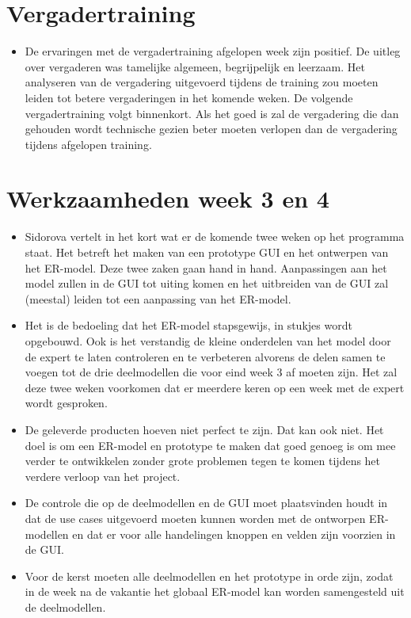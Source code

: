 \documentclass[]{article}
\begin{document}
\section{Vergadertraining}

  \begin{itemize}
    \item De ervaringen met de vergadertraining afgelopen week zijn positief. De uitleg over vergaderen was tamelijke algemeen, begrijpelijk en leerzaam. Het analyseren van de vergadering uitgevoerd tijdens de training zou moeten leiden tot betere vergaderingen in het komende weken. De volgende vergadertraining volgt binnenkort. Als het goed is zal de vergadering die dan gehouden wordt technische gezien beter moeten verlopen dan de vergadering tijdens afgelopen training.
  \end{itemize}

\section{Werkzaamheden week 3 en 4}

  \begin{itemize}
    \item Sidorova vertelt in het kort wat er de komende twee weken op het programma staat. Het betreft het maken van een prototype GUI en het ontwerpen van het ER-model. Deze twee zaken gaan hand in hand. Aanpassingen aan het model zullen in de GUI tot uiting komen en het uitbreiden van de GUI zal (meestal) leiden tot een aanpassing van het ER-model.
        
    \item Het is de bedoeling dat het ER-model stapsgewijs, in stukjes wordt opgebouwd. Ook is het verstandig de kleine onderdelen van het model door de expert te laten controleren en te verbeteren alvorens de delen samen te voegen tot de drie deelmodellen die voor eind week 3 af moeten zijn. Het zal deze twee weken voorkomen dat er meerdere keren op een week met de expert wordt gesproken.
        
    \item De geleverde producten hoeven niet perfect te zijn. Dat kan ook niet. Het doel is om een ER-model en prototype te maken dat goed genoeg is om mee verder te ontwikkelen zonder grote problemen tegen te komen tijdens het verdere verloop van het project.
        
    \item De controle die op de deelmodellen en de GUI moet plaatsvinden houdt in dat de use cases uitgevoerd moeten kunnen worden met de ontworpen ER-modellen en dat er voor alle handelingen knoppen en velden zijn voorzien in de GUI.
        
    \item Voor de kerst moeten alle deelmodellen en het prototype in orde zijn, zodat in de week na de vakantie het globaal ER-model kan worden samengesteld uit de deelmodellen.
  \end{itemize}
\end{document}
